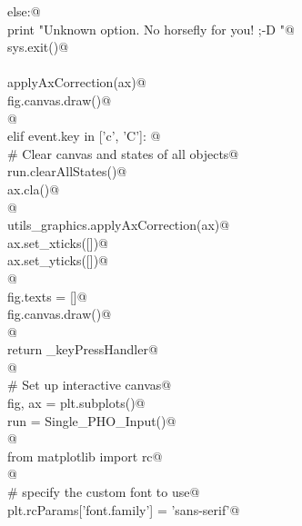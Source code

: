 \documentclass[12.0pt]{report}
\begin{document}
\begin{flushleft}
\begin{list}{}{}
\mbox{}\verb@                    else:@\\
\mbox{}\verb@                          print "Unknown option. No horsefly for you! ;-D "@\\
\mbox{}\verb@                          sys.exit()@\\
\mbox{}\verb@@\\
\mbox{}\verb@                    applyAxCorrection(ax)@\\
\mbox{}\verb@                    fig.canvas.draw()@\\
\mbox{}\verb@                    @\\
\mbox{}\verb@               elif event.key in ['c', 'C']: @\\
\mbox{}\verb@                    # Clear canvas and states of all objects@\\
\mbox{}\verb@                    run.clearAllStates()@\\
\mbox{}\verb@                    ax.cla()@\\
\mbox{}\verb@                                  @\\
\mbox{}\verb@                    utils_graphics.applyAxCorrection(ax)@\\
\mbox{}\verb@                    ax.set_xticks([])@\\
\mbox{}\verb@                    ax.set_yticks([])@\\
\mbox{}\verb@                                     @\\
\mbox{}\verb@                    fig.texts = []@\\
\mbox{}\verb@                    fig.canvas.draw()@\\
\mbox{}\verb@                    @\\
\mbox{}\verb@           return _keyPressHandler@\\
\mbox{}\verb@    @\\
\mbox{}\verb@    # Set up interactive canvas@\\
\mbox{}\verb@    fig, ax =  plt.subplots()@\\
\mbox{}\verb@    run = Single_PHO_Input()@\\
\mbox{}\verb@        @\\
\mbox{}\verb@    from matplotlib import rc@\\
\mbox{}\verb@    @\\
\mbox{}\verb@    # specify the custom font to use@\\
\mbox{}\verb@    plt.rcParams['font.family'] = 'sans-serif'@\\

\end{list}
\end{flushleft}
\end{document}
